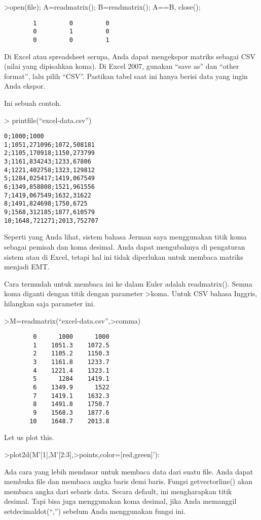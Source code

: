 \documentclass[
]{book}
\begin{document}
\textgreater open(file); A=readmatrix(); B=readmatrix(); A==B, close();

\begin{verbatim}
        1         0         0 
        0         1         0 
        0         0         1 
\end{verbatim}

Di Excel atau spreadsheet serupa, Anda dapat mengekspor matriks sebagai CSV (nilai yang dipisahkan koma). Di Excel 2007, gunakan ``save as'' dan ``other format'', lalu pilih ``CSV''. Pastikan tabel saat ini hanya berisi data yang ingin Anda ekspor.

Ini sebuah contoh.

\textgreater{} printfile(``excel-data.csv'')

\begin{verbatim}
0;1000;1000
1;1051,271096;1072,508181
2;1105,170918;1150,273799
3;1161,834243;1233,67806
4;1221,402758;1323,129812
5;1284,025417;1419,067549
6;1349,858808;1521,961556
7;1419,067549;1632,31622
8;1491,824698;1750,6725
9;1568,312185;1877,610579
10;1648,721271;2013,752707
\end{verbatim}

Seperti yang Anda lihat, sistem bahasa Jerman saya menggunakan titik koma sebagai pemisah dan koma desimal. Anda dapat mengubahnya di pengaturan sistem atau di Excel, tetapi hal ini tidak diperlukan untuk membaca matriks menjadi EMT.

Cara termudah untuk membaca ini ke dalam Euler adalah readmatrix(). Semua koma diganti dengan titik dengan parameter \textgreater koma. Untuk CSV bahasa Inggris, hilangkan saja parameter ini.

\textgreater M=readmatrix(``excel-data.csv'',\textgreater comma)

\begin{verbatim}
        0      1000      1000 
        1    1051.3    1072.5 
        2    1105.2    1150.3 
        3    1161.8    1233.7 
        4    1221.4    1323.1 
        5      1284    1419.1 
        6    1349.9      1522 
        7    1419.1    1632.3 
        8    1491.8    1750.7 
        9    1568.3    1877.6 
       10    1648.7    2013.8 
\end{verbatim}

Let us plot this.

\textgreater plot2d(M'{[}1{]},M'{[}2:3{]},\textgreater points,color={[}red,green{]}'):

Ada cara yang lebih mendasar untuk membaca data dari suatu file. Anda dapat membuka file dan membaca angka baris demi baris. Fungsi getvectorline() akan membaca angka dari sebaris data. Secara default, ini mengharapkan titik desimal. Tapi bisa juga menggunakan koma desimal, jika Anda memanggil setdecimaldot(``,'') sebelum Anda menggunakan fungsi ini.
\end{document}
